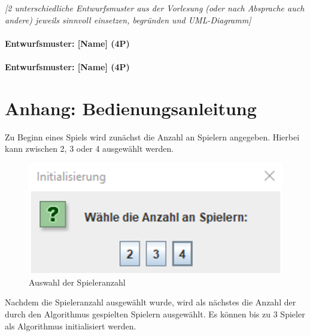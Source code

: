 \emph{[2 unterschiedliche Entwurfsmuster aus der Vorlesung (oder nach Absprache auch andere) jeweils
sinnvoll einsetzen, begründen und UML-Diagramm]}

\subsubsection{Entwurfsmuster: [Name] (4P)}
\subsubsection{Entwurfsmuster: [Name] (4P)}

\newpage
\titlespacing*{\chapter}{0pt}{-30mm}{10pt}
  
\chapter{Anhang: Bedienungsanleitung}
\pagestyle{scrheadings}
\clearscrheadfoot
{}
\setcounter{page}{36}
\ofoot[\pagemark]{\pagemark}
\onehalfspacing

\noindent Zu Beginn eines Spiels wird zunächst die Anzahl an Spielern angegeben. Hierbei kann zwischen 2, 3 oder 4 ausgewählt werden.

\begin{figure}[htbp]
\centering
\centerline{\includegraphics[scale=.5]{anleitung1}}
\caption{Auswahl der Spieleranzahl}
\label{fig:anleitung1}
\end{figure}

\noindent Nachdem die Spieleranzahl ausgewählt wurde, wird als nächstes die Anzahl der durch den Algorithmus gespielten Spielern ausgewählt. Es können bis zu 3 Spieler als Algorithmus initialisiert werden.

